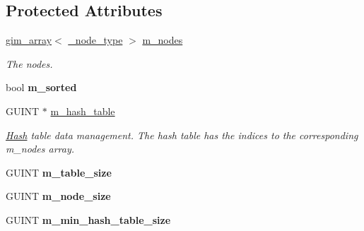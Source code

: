 \subsection*{Protected Attributes}
\begin{DoxyCompactItemize}
\item 
\hypertarget{classgim__hash__table_ada83cac38bcf3fd282287f463def04e4}{\hyperlink{classgim__array}{gim\+\_\+array}$<$ \hyperlink{struct_g_i_m___h_a_s_h___t_a_b_l_e___n_o_d_e}{\+\_\+node\+\_\+type} $>$ \hyperlink{classgim__hash__table_ada83cac38bcf3fd282287f463def04e4}{m\+\_\+nodes}}\label{classgim__hash__table_ada83cac38bcf3fd282287f463def04e4}

\begin{DoxyCompactList}\small\item\em The nodes. \end{DoxyCompactList}\item 
\hypertarget{classgim__hash__table_adefa6197dfd5c1564969b38d4d27848b}{bool {\bfseries m\+\_\+sorted}}\label{classgim__hash__table_adefa6197dfd5c1564969b38d4d27848b}

\item 
\hypertarget{classgim__hash__table_a35f6b0d640222067b9c76e61887e0354}{G\+U\+I\+N\+T $\ast$ \hyperlink{classgim__hash__table_a35f6b0d640222067b9c76e61887e0354}{m\+\_\+hash\+\_\+table}}\label{classgim__hash__table_a35f6b0d640222067b9c76e61887e0354}

\begin{DoxyCompactList}\small\item\em \hyperlink{struct_hash}{Hash} table data management. The hash table has the indices to the corresponding m\+\_\+nodes array. \end{DoxyCompactList}\item 
\hypertarget{classgim__hash__table_a39de8ad99c0fd79c595aa95d14be4e72}{G\+U\+I\+N\+T {\bfseries m\+\_\+table\+\_\+size}}\label{classgim__hash__table_a39de8ad99c0fd79c595aa95d14be4e72}

\item 
\hypertarget{classgim__hash__table_a1f81ffd2e5dd96b222eafa228ae6aa9c}{G\+U\+I\+N\+T {\bfseries m\+\_\+node\+\_\+size}}\label{classgim__hash__table_a1f81ffd2e5dd96b222eafa228ae6aa9c}

\item 
\hypertarget{classgim__hash__table_ad0eb38448dd75c3a7964ff0fd5c6c7d0}{G\+U\+I\+N\+T {\bfseries m\+\_\+min\+\_\+hash\+\_\+table\+\_\+size}}\label{classgim__hash__table_ad0eb38448dd75c3a7964ff0fd5c6c7d0}

\end{DoxyCompactItemize}


